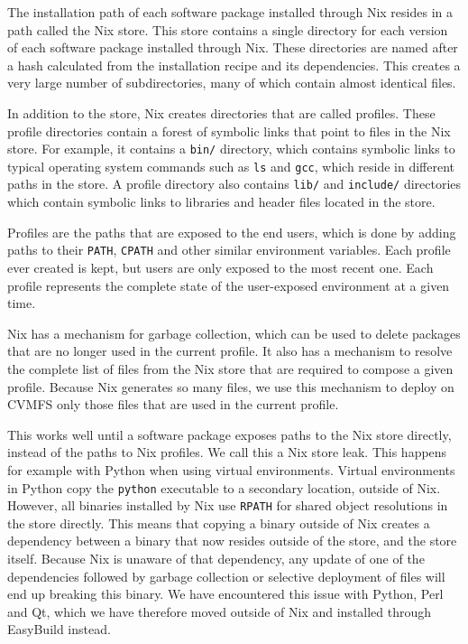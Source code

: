 \documentclass[sigconf]{acmart}
\begin{document}
The installation path of each software package installed through Nix resides in a path called the Nix store. This store contains a single directory for each version of each software package installed through Nix. These directories are named after a hash calculated from the installation recipe and its dependencies. This creates a very large number of subdirectories, many of which contain almost identical files. 

In addition to the store, Nix creates directories that are called profiles. These profile directories contain a forest of symbolic links that point to files in the Nix store. For example, it contains a \texttt{bin/} directory, which contains symbolic links to typical operating system commands such as \texttt{ls} and \texttt{gcc}, which reside in different paths in the store. A profile directory also contains \texttt{lib/} and \texttt{include/} directories which contain symbolic links to libraries and header files located in the store. 

Profiles are the paths that are exposed to the end users, which is done by adding paths to their \texttt{PATH}, \texttt{CPATH} and other similar environment variables. Each profile ever created is kept, but users are only exposed to the most recent one. Each profile represents the complete state of the user-exposed environment at a given time.

Nix has a mechanism for garbage collection, which can be used to delete packages that are no longer used in the current profile. It also has a mechanism to resolve the complete list of files from the Nix store that are required to compose a given profile. Because Nix generates so many files, we use this mechanism to deploy on CVMFS only those files that are used in the current profile. 

This works well until a software package exposes paths to the Nix store directly, instead of the paths to Nix profiles. We call this a Nix store leak. This happens for example with Python when using virtual environments. Virtual environments in Python copy the \texttt{python} executable to a secondary location, outside of Nix. However, all binaries installed by Nix use \texttt{RPATH} for shared object resolutions in the store directly. This means that copying a binary outside of Nix creates a dependency between a binary that now resides outside of the store, and the store itself. Because Nix is unaware of that dependency, any update of one of the dependencies followed by garbage collection or selective deployment of files will end up breaking this binary. We have encountered this issue with Python, Perl and Qt, which we have therefore moved outside of Nix and installed through EasyBuild instead.
\end{document}
